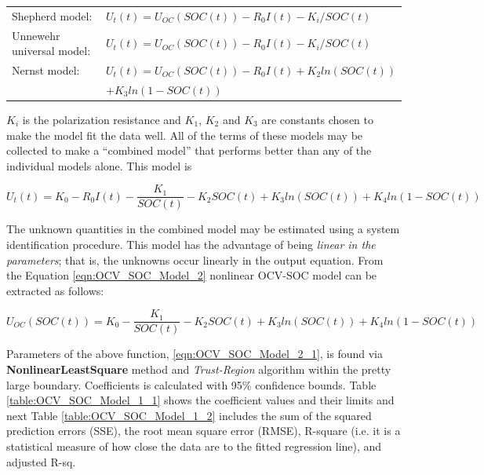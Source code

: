 \documentclass[12pt]{article}
\begin{document}
\begin{appendices}
\begin{tabular}{ll}
	Shepherd model:  &$U_{t}(t) = U_{OC}(SOC(t)) - R_{0}I(t) - K_{i}/SOC(t)$ \\
	Unnewehr universal model: &$U_{t}(t) = U_{OC}(SOC(t)) - R_{0}I(t) - K_{i}/SOC(t)$ \\
	Nernst model: &$U_{t}(t) = U_{OC}(SOC(t)) - R_{0}I(t) +  K_{2} ln(SOC(t))$ \\
	 &$+ K_{3}ln(1-SOC(t))$
\end{tabular} \newline

\par \noindent $K_{i}$ is
the polarization resistance and $K_{1}$, $K_{2}$ and $K_{3}$ are constants
 chosen to make the model fit the data well. All of the terms of
these models may be collected to make a “combined model”
 that performs better than any of the individual models alone.
This model is

\begin{equation}
	\label{eqn:OCV_SOC_Model_2}
	U_{t}(t) = K_{0} - R_{0}I(t) - \frac{K_{1}}{SOC(t)} - K_{2}SOC(t) + K_{3}ln(SOC(t)) + K_{4}ln(1 - SOC(t))
\end{equation}

\noindent The unknown quantities in the combined model may be estimated using a system identification procedure. This model
 has the advantage of being \textit{linear in the parameters}; that is,
the unknowns occur linearly in the output equation. From the Equation \ref{eqn:OCV_SOC_Model_2} nonlinear OCV-SOC model can be extracted as follows: 

\begin{equation}
	\label{eqn:OCV_SOC_Model_2_1}
	U_{OC}(SOC(t)) = K_{0} - \frac{K_{1}}{SOC(t)} - K_{2}SOC(t) + K_{3}ln(SOC(t)) + K_{4}ln(1 - SOC(t))
\end{equation}

\par \noindent Parameters of the above function, \ref{eqn:OCV_SOC_Model_2_1},  is found via \textbf{NonlinearLeastSquare} method and \textit{Trust-Region} algorithm within the pretty large boundary. Coefficients is calculated with 95\% confidence bounds. Table \ref{table:OCV_SOC_Model_1_1} shows the coefficient values and their limits and next Table \ref{table:OCV_SOC_Model_1_2} includes the sum of the squared prediction errors (SSE), the root mean square error (RMSE), R-square (i.e. it is a statistical measure of how close the data are to the fitted regression line), and adjusted R-sq.


\end{appendices}
\end{document}
